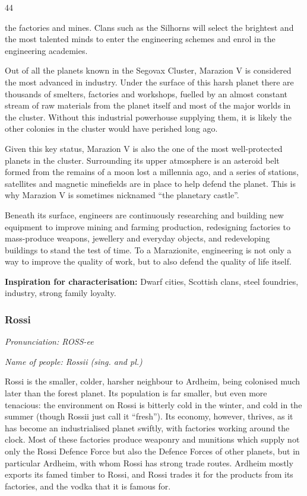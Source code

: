 44

the factories and mines. Clans such as the Silhorns will select the brightest and the most talented minds to enter the engineering schemes and enrol in the engineering academies.

Out of all the planets known in the Segovax Cluster, Marazion V is considered the most advanced in industry. Under the surface of this harsh planet there are thousands of smelters, factories and workshops, fuelled by an almost constant stream of raw materials from the planet itself and most of the major worlds in the cluster. Without this industrial powerhouse supplying them, it is likely the other colonies in the cluster would have perished long ago.

Given this key status, Marazion V is also the one of the most well-protected planets in the cluster. Surrounding its upper atmosphere is an asteroid belt formed from the remains of a moon lost a millennia ago, and a series of stations, satellites and magnetic minefields are in place to help defend the planet. This is why Marazion V is sometimes nicknamed ``the planetary castle''.

Beneath its surface, engineers are continuously researching and building new equipment to improve mining and farming production, redesigning factories to mass-produce weapons, jewellery and everyday objects, and redeveloping buildings to stand the test of time. To a Marazionite, engineering is not only a way to improve the quality of work, but to also defend the quality of life itself.

\textbf{Inspiration for characterisation:} Dwarf cities, Scottish clans, steel foundries, industry, strong family loyalty.

\subsubsection{Rossi}

\textit{Pronunciation: ROSS-ee}

\textit{Name of people: Rossii (sing. and pl.)}

Rossi is the smaller, colder, harsher neighbour to Ardheim, being colonised much later than the forest planet. Its population is far smaller, but even more tenacious: the environment on Rossi is bitterly cold in the winter, and cold in the summer (though Rossii just call it ``fresh''). Its economy, however, thrives, as it has become an industrialised planet swiftly, with factories working around the clock. Most of these factories produce weaponry and munitions which supply not only the Rossi Defence Force but also the Defence Forces of other planets, but in particular Ardheim, with whom Rossi has strong trade routes. Ardheim mostly exports its famed timber to Rossi, and Rossi trades it for the products from its factories, and the vodka that it is famous for.

